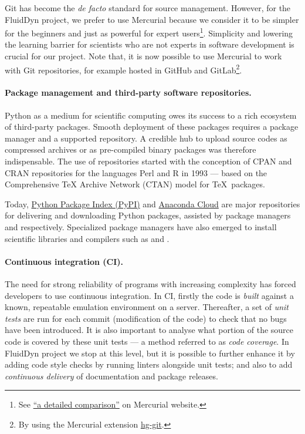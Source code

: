 Git has become the \textit{de facto} standard for source management. However,
for the FluidDyn project, we prefer to use Mercurial because we consider it to
be simpler for the beginners and just as powerful for expert users\footnote{See
\href{https://www.mercurial-scm.org/wiki/GitConcepts}{``a detailed
comparison''} on Mercurial website.}. Simplicity and lowering the learning
barrier for scientists who are not experts in software development is crucial
for our project.
%
Note that, it is now possible to use Mercurial to work with Git repositories,
for example hosted in GitHub and GitLab\footnote{By using the Mercurial
extension \href{http://hg-git.github.io/}{hg-git}.}.

\paragraph{Package management and third-party software repositories.} Python
as a medium for scientific computing owes its success to a rich ecosystem of
third-party packages.  Smooth deployment of these packages requires a package
manager and a supported repository. A credible hub to upload source codes as
compressed archives or as pre-compiled binary packages was therefore
indispensable. The use of repositories started with the conception of CPAN and
CRAN repositories for the languages Perl and R in 1993 --- based on the
Comprehensive TeX Archive Network (CTAN) model for \TeX\ packages. 

Today, \href{https://pypi.org}{Python Package Index (PyPI)} and
\href{https://anaconda.org}{Anaconda Cloud} are major repositories for
delivering and downloading Python packages, assisted by package managers
 and  respectively.
Specialized package managers have also emerged to install scientific
libraries and compilers such as  and .

\paragraph{Continuous integration (CI).} The need for strong reliability of
programs with increasing complexity has forced developers to use continuous
integration.
%
In CI, firstly the code is \emph{built} against a known, repeatable emulation
environment on a server. Thereafter, a set of \emph{unit tests} are run for each
commit (modification of the code) to check that no bugs have been introduced. It
is also important to analyse what portion of the source code is covered by these
unit tests --- a method referred to as \emph{code coverage}. In FluidDyn project
we stop at this level, but it is possible to further enhance it by adding code
style checks by running linters alongside unit tests; and also to add
\emph{continuous delivery} of documentation and package releases.

